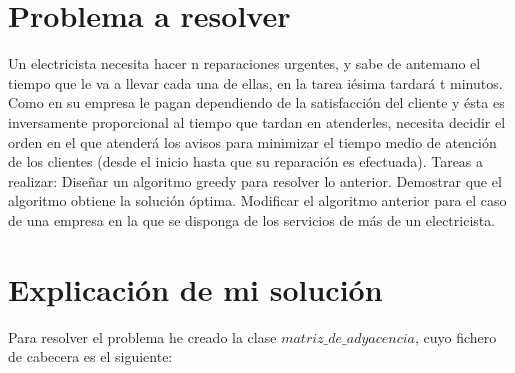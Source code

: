 \documentclass[12pt]{article}
\begin{document}
\section{Problema a resolver}
Un electricista necesita hacer n reparaciones urgentes, y sabe de antemano el tiempo que le va a llevar cada una de ellas, en la tarea iésima tardará t minutos. Como en su empresa le pagan dependiendo de la satisfacción del cliente y ésta es inversamente proporcional al tiempo que tardan en atenderles, necesita decidir el orden en el que atenderá los avisos para minimizar el tiempo medio de atención de los clientes (desde el inicio hasta que su reparación es efectuada). 
Tareas a realizar: Diseñar un algoritmo greedy para resolver lo anterior. Demostrar que el algoritmo obtiene la solución óptima. Modificar el algoritmo anterior para el caso de una empresa en la que se disponga de los servicios de más de un electricista.

\section{Explicación de mi solución}
Para resolver el problema he creado la clase $matriz\_de\_adyacencia$, cuyo fichero de cabecera es el siguiente: 
\end{document}

